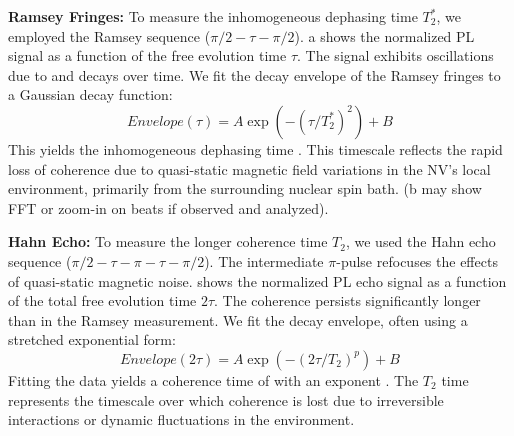 \documentclass[aps,prb,twocolumn,superscriptaddress,floatfix,longbibliography,citeautoscript]{revtex4-2}
\begin{document}
\textbf{Ramsey Fringes:} To measure the inhomogeneous dephasing time $T_2^*$, we employed the Ramsey sequence ($\pi/2 - \tau - \pi/2$).
a shows the normalized PL signal as a function of the free evolution time $\tau$.
The signal exhibits oscillations due to  and decays over time.
We fit the decay envelope of the Ramsey fringes to a Gaussian decay function:
\begin{equation}
    Envelope(\tau) = A \exp(-(\tau/T_2^*)^2) + B
    \label{eq:ramsey_fit}
\end{equation}
This yields the inhomogeneous dephasing time .
This timescale reflects the rapid loss of coherence due to quasi-static magnetic field variations in the NV's local environment, primarily from the surrounding nuclear spin bath.
(b may show FFT or zoom-in on beats if observed and analyzed).

\textbf{Hahn Echo:} To measure the longer coherence time $T_2$, we used the Hahn echo sequence ($\pi/2 - \tau - \pi - \tau - \pi/2$).
The intermediate $\pi$-pulse refocuses the effects of quasi-static magnetic noise.
 shows the normalized PL echo signal as a function of the total free evolution time $2\tau$.
The coherence persists significantly longer than in the Ramsey measurement.
We fit the decay envelope, often using a stretched exponential form:
\begin{equation}
    Envelope(2\tau) = A \exp(-(2\tau/T_2)^p) + B
    \label{eq:hahn_fit}
\end{equation}
Fitting the data yields a coherence time of  with an exponent .
The $T_2$ time represents the timescale over which coherence is lost due to irreversible interactions or dynamic fluctuations in the environment.

\end{document}
